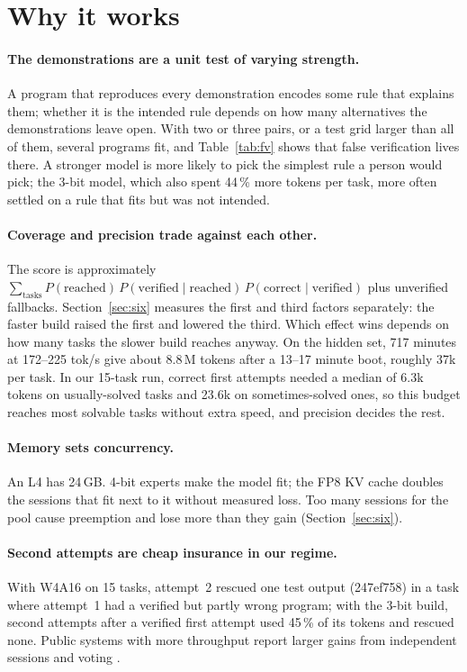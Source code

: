 \documentclass[11pt]{article}
\begin{document}
\section{Why it works}
\paragraph{The demonstrations are a unit test of varying strength.} A program that reproduces every demonstration encodes some rule that explains them; whether it is the intended rule depends on how many alternatives the demonstrations leave open. With two or three pairs, or a test grid larger than all of them, several programs fit, and Table~\ref{tab:fv} shows that false verification lives there. A stronger model is more likely to pick the simplest rule a person would pick; the 3-bit model, which also spent 44\,\% more tokens per task, more often settled on a rule that fits but was not intended.

\paragraph{Coverage and precision trade against each other.} The score is approximately $\sum_{\text{tasks}} P(\text{reached})\,P(\text{verified}\mid\text{reached})\,P(\text{correct}\mid\text{verified})$ plus unverified fallbacks. Section~\ref{sec:six} measures the first and third factors separately: the faster build raised the first and lowered the third. Which effect wins depends on how many tasks the slower build reaches anyway. On the hidden set, 717 minutes at 172--225 tok/s give about 8.8\,M tokens after a 13--17 minute boot, roughly 37k per task. In our 15-task run, correct first attempts needed a median of 6.3k tokens on usually-solved tasks and 23.6k on sometimes-solved ones, so this budget reaches most solvable tasks without extra speed, and precision decides the rest.

\paragraph{Memory sets concurrency.} An L4 has 24\,GB. 4-bit experts make the model fit; the FP8 KV cache doubles the sessions that fit next to it without measured loss. Too many sessions for the pool cause preemption and lose more than they gain (Section~\ref{sec:six}).

\paragraph{Second attempts are cheap insurance in our regime.} With W4A16 on 15 tasks, attempt~2 rescued one test output (247ef758) in a task where attempt~1 had a verified but partly wrong program; with the 3-bit build, second attempts after a verified first attempt used 45\,\% of its tokens and rescued none. Public systems with more throughput report larger gains from independent sessions and voting \cite{majkel2026,yichia2026}.
\end{document}
